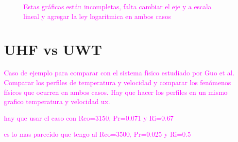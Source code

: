 \begin{figure}[H]
  \centering
  \caption{\textcolor{magenta}{Estas gráficas están incompletas, falta cambiar el eje y a escala lineal y agregar la ley logaritmica en ambos casos}}
  \label{fig:Re5000-Pr071}
\end{figure}




\section{UHF vs UWT}

\textcolor{magenta}{Caso de ejemplo para comparar con el sistema físico estudiado por Guo et al. Comparar los perfiles de temperatura y velocidad y comparar los fenómenos físicos que ocurren en ambos casos. Hay que hacer los perfiles en un mismo grafico temperatura y velocidad ux.}

\textcolor{magenta}{hay que usar el caso con Reo=3150, Pr=0.071 y Ri=0.67} 

\textcolor{magenta}{es lo mas parecido que tengo al Reo=3500, Pr=0.025 y Ri=0.5}

